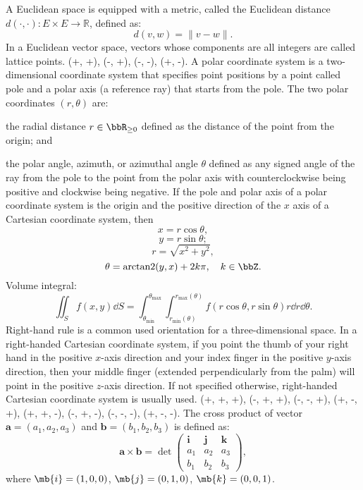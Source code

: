 \documentclass[a4paper,12pt]{report}
\begin{document}
A Euclidean space is equipped with a metric, called the Euclidean distance $d(\cdot,\cdot)\colon E\times E\to\mathbb{R}$, defined as:
\[d(v,w)=\|v-w\|.\]
In a Euclidean vector space, vectors whose components are all integers are called lattice points.
(+, +), (-, +), (-, -), (+, -).
A polar coordinate system is a two-dimensional coordinate system that specifies point positions by a point called pole and a polar axis (a reference ray) that starts from the pole. The two polar coordinates $(r,\theta)$ are:
\bit
\item the radial distance $r\in\bbR_{\geq 0}$ defined as the distance of the point from the origin; and
\item the polar angle, azimuth, or azimuthal angle $\theta$ defined as any signed angle of the ray from the pole to the point from the polar axis with counterclockwise being positive and clockwise being negative.
\eit
If the pole and polar axis of a polar coordinate system is the origin and the positive direction of the $x$ axis of a Cartesian coordinate system, then
\[x=r\cos\theta,\]
\[y=r\sin\theta;\]
\[r=\sqrt{x^2+y^2},\]
\[\theta=\operatorname{arctan2}(y,x)+2k\pi,\quad k\in\bbZ.\]
Volume integral:
\[\iint_Sf(x,y)\dd{S}=\int_{\theta_\text{min}}^{\theta_\text{max}}\int_{r_\text{min}(\theta)}^{r_\text{max}(\theta)}f(r\cos\theta,r\sin\theta)r\dd{r}\dd{\theta}.\]
Right-hand rule is a common used orientation for a three-dimensional space. In a right-handed Cartesian coordinate system, if you point the thumb of your right hand in the positive $x$-axis direction and your index finger in the positive $y$-axis direction, then your middle finger (extended perpendicularly from the palm) will point in the positive $z$-axis direction. If not specified otherwise, right-handed Cartesian coordinate system is usually used.
(+, +, +), (-, +, +), (-, -, +), (+, -, +), (+, +, -), (-, +, -), (-, -, -), (+, -, -).
The cross product of vector $\mathbf{a}=(a_1,a_2,a_3)$ and $\mathbf{b}=(b_1,b_2,b_3)$ is defined as:
\[\mathbf{a}\times\mathbf{b}=\det\begin{pmatrix}\mathbf{i} & \mathbf{j} & \mathbf{k}\\a_1 & a_2 & a_3\\b_1 & b_2 & b_3\end{pmatrix},\]
where $\mb{i}=(1,0,0)$, $\mb{j}=(0,1,0)$, $\mb{k}=(0,0,1)$.
\end{document}
